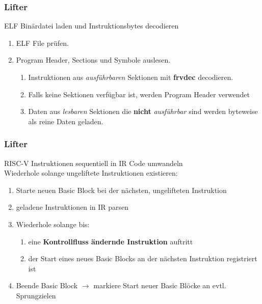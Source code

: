 
\begin{frame}[fragile]
    \frametitle{Lifter}{ELF Binärdatei laden und Instruktionsbytes decodieren}
    \begin{enumerate}
        \setlength\itemsep{0.6em}
        \item ELF File prüfen.
        \item Program Header, Sections und Symbole auslesen.
              \vspace{0.5em}
              \begin{enumerate}
                  \setlength\itemsep{0.6em}
                  \item Instruktionen aus \textit{ausführbaren} Sektionen mit \textbf{frvdec} decodieren.
                  \item Falls keine Sektionen verfügbar ist, werden Program Header verwendet
                  \item Daten aus \textit{lesbaren} Sektionen die \textbf{nicht} \textit{ausführbar} sind werden
                        byteweise als reine Daten geladen.
              \end{enumerate}
    \end{enumerate}
\end{frame}
\clearpage



\begin{frame}
    \frametitle{Lifter}{RISC-V Instruktionen sequentiell in IR Code umwandeln}
    \\\vspace{0.5em}
    Wiederhole solange ungeliftete Instruktionen existieren:
    \begin{enumerate}
        \setlength{\itemsep}{0.8em}
        \item Starte neuen Basic Block bei der nächsten, ungelifteten Instruktion
        \item geladene Instruktionen in IR parsen
        \item Wiederhole solange bis:
              \begin{enumerate}
                  \vspace{1em}
                  \setlength{\itemsep}{1em}
                  \item eine \textbf{Kontrollfluss ändernde Instruktion} auftritt
                  \item der Start eines
                        neues Basic Blocks an der nächsten Instruktion registriert ist
              \end{enumerate}
        \item Beende Basic Block $\rightarrow$ markiere Start neuer Basic Blöcke an evtl. Sprungzielen
    \end{enumerate}
\end{frame}
\clearpage

